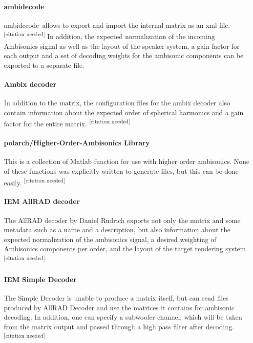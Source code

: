 \documentclass[a4paper, 10pt, twocolumn]{article}
\newcommand{\citationneeded}[1][]{\textsuperscript{\color{black} [citation needed]}}
\begin{document}
\paragraph{ambidecode\texttildelow}

ambidecode\texttildelow\ allows to export and import the internal matrix as an xml file.\citationneeded{} In addition, the expected normalization of the incoming Ambisonics signal as well as the layout of the speaker system, a gain factor for each output and a set of decoding weights for the ambisonic components can be exported to a separate file.

\paragraph{Ambix decoder}

In addition to the matrix, the configuration files for the ambix decoder also contain information about the expected order of spherical harmonics and a gain factor for the entire matrix.\citationneeded{}

\paragraph{polarch/Higher-Order-Ambisonics Library}

This is a collection of Matlab function for use with higher order ambisonics. None of these functions was explicitly written to generate files, but this can be done easily.\citationneeded{}

\paragraph{IEM AllRAD decoder}

The AllRAD decoder by Daniel Rudrich exports not only the matrix and some metadata such as a name and a description, but also information about the expected normalization of the ambisonics signal, a desired weighting of Ambisonics components per order, and the layout of the target rendering system.\citationneeded{}

\paragraph{IEM Simple Decoder}

The Simple Decoder is unable to produce a matrix itself, but can read files produced by AllRAD Decoder and use the matrices it contains for ambisonic decoding. In addition, one can specify a subwoofer channel, which will be taken from the matrix output and passed through a high pass filter after decoding.\citationneeded{}
\end{document}
